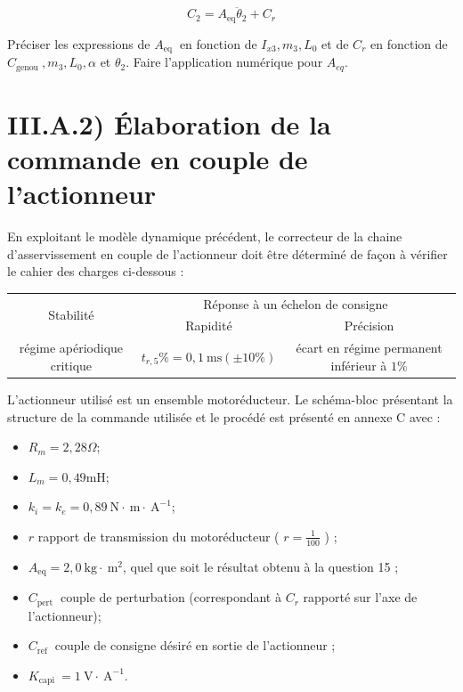 \documentclass[10pt]{article}
\begin{document}
$$
C_{2}=A_{\mathrm{eq}} \ddot{\theta}_{2}+C_{r}
$$

Préciser les expressions de $A_{\text {eq }}$ en fonction de $I_{x 3}, m_{3}, L_{0}$ et de $C_{r}$ en fonction de $C_{\text {genou }}, m_{3}, L_{0}, \alpha$ et $\theta_{2}$. Faire l'application numérique pour $A_{e q}$.

\section*{III.A.2) Élaboration de la commande en couple de l'actionneur}
En exploitant le modèle dynamique précédent, le correcteur de la chaine d'asservissement en couple de l'actionneur doit être déterminé de façon à vérifier le cahier des charges ci-dessous :

\begin{center}
\begin{tabular}{|c|c|c|}
\hline
\multirow{2}{*}{Stabilité} & \multicolumn{2}{|c|}{Réponse à un échelon de consigne} \\
\cline { 2 - 3 }
 & Rapidité & Précision \\
\hline
régime apériodique critique & $t_{r, 5} \%=0,1 \mathrm{~ms}( \pm 10 \%)$ & écart en régime permanent inférieur à $1 \%$ \\
\hline
\end{tabular}
\end{center}

L'actionneur utilisé est un ensemble motoréducteur. Le schéma-bloc présentant la structure de la commande utilisée et le procédé est présenté en annexe C avec :

\begin{itemize}
  \item $R_{m}=2,28 \Omega$;
  \item $L_{m}=0,49 \mathrm{mH}$;
  \item $k_{i}=k_{e}=0,89 \mathrm{~N} \cdot \mathrm{~m} \cdot \mathrm{~A}^{-1}$;
  \item $r$ rapport de transmission du motoréducteur ( $r=\frac{1}{100}$ ) ;
  \item $A_{\mathrm{eq}}=2,0 \mathrm{~kg} \cdot \mathrm{~m}^{2}$, quel que soit le résultat obtenu à la question 15 ;
  \item $C_{\text {pert }}$ couple de perturbation (correspondant à $C_{r}$ rapporté sur l'axe de l'actionneur);
  \item $C_{\text {ref }}$ couple de consigne désiré en sortie de l'actionneur ;
  \item $K_{\text {capi }}=1 \mathrm{~V} \cdot \mathrm{~A}^{-1}$.
\end{itemize}
\end{document}
